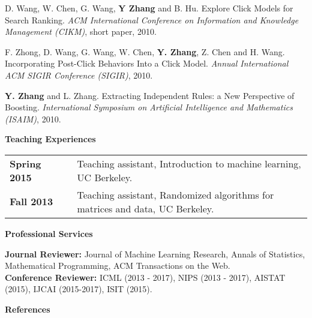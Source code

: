 \documentclass[11pt]{res} %
\begin{document}
{\begin{resume}
\begin{enumerate}[ {[C}1{]} ]
\item D. Wang, W. Chen, G. Wang, \textbf{Y Zhang} and B. Hu. Explore Click Models for Search Ranking.
\emph{ACM International Conference on Information and Knowledge Management (CIKM)}, short paper, 2010.

\item F. Zhong, D. Wang, G. Wang, W. Chen, \textbf{Y. Zhang}, Z. Chen and H. Wang. Incorporating Post-Click Behaviors Into a Click Model.
\emph{Annual International ACM SIGIR Conference (SIGIR)}, 2010.

\item \textbf{Y. Zhang} and L. Zhang. Extracting Independent Rules: a New Perspective of Boosting. 
\emph{International Symposium on Artificial Intelligence and Mathematics (ISAIM)}, 2010.
\end{enumerate}

{\Large\bf Teaching Experiences}

\vspace{-5pt}
\begin{tabular}{ll}
{\bf Spring 2015}~~~ & Teaching assistant, Introduction to machine learning, UC Berkeley.\\
{\bf Fall 2013} & Teaching assistant, Randomized algorithms for matrices and data, UC Berkeley.
\end{tabular}

{\Large\bf Professional Services}

\vspace{-5pt}
{\bf Journal Reviewer:} Journal of Machine Learning Research, Annals of Statistics, Mathematical Programming, ACM Transactions on the Web. \\
{\bf Conference Reviewer:} ICML (2013 - 2017), NIPS (2013 - 2017), AISTAT (2015), IJCAI (2015-2017), ISIT (2015).

{\Large\bf References}


\end{resume}}
\end{document}
